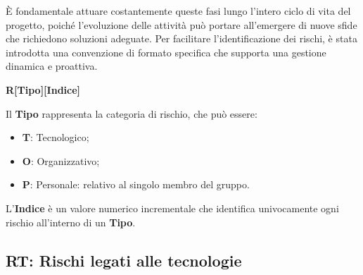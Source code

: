 È fondamentale attuare costantemente queste fasi lungo l'intero ciclo di vita del progetto, poiché l'evoluzione delle attività può portare all'emergere di nuove sfide che richiedono soluzioni adeguate. Per facilitare l'identificazione dei rischi, è stata introdotta una convenzione di formato specifica che supporta una gestione dinamica e proattiva.
\begin{center}
\textbf{R[Tipo][Indice]}
\end{center}
Il \textbf{Tipo} rappresenta la categoria di rischio, che può essere:
\begin{itemize}
    \item \textbf{T}: Tecnologico;
    \item \textbf{O}: Organizzativo;
    \item \textbf{P}: Personale: relativo al singolo membro del gruppo.
\end{itemize}

L'\textbf{Indice} è un valore numerico incrementale che identifica univocamente ogni rischio all'interno di un \textbf{Tipo}.

\newpage

\subsection{RT: Rischi legati alle tecnologie}

